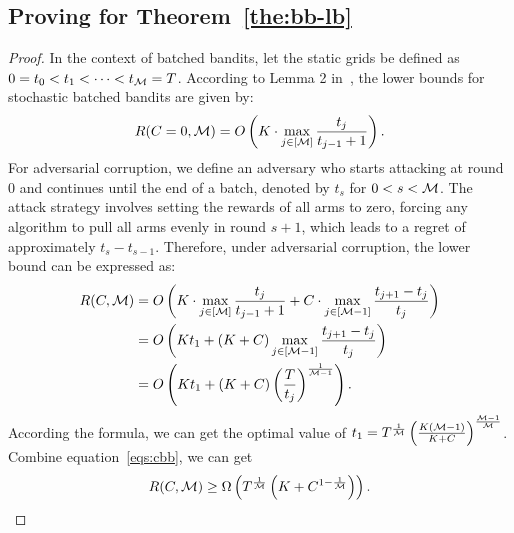 \subsection{Proving for Theorem~\ref{the:bb-lb}}
\begin{proof}
    In the context of batched bandits, let the static grids be defined as \( 0 = t_0 < t_1 < \cdots < t_{{\mathcal{M}}} = T \). According to Lemma 2 in~\cite{gao2019batched}, the lower bounds for stochastic batched bandits are given by:
    \begin{equation}
    \label{eqs:sbb}
        R(C = 0, {\mathcal{M}}) = O\left(K \cdot \max_{j \in [{\mathcal{M}}]}\frac{t_j}{t_{j-1} + 1}\right).
    \end{equation}
    For adversarial corruption, we define an adversary who starts attacking at round \(0\) and continues until the end of a batch, denoted by \( t_s \) for \( 0 < s < {\mathcal{M}} \). The attack strategy involves setting the rewards of all arms to zero, forcing any algorithm to pull all arms evenly in round \( s+1 \), which leads to a regret of approximately \( t_s - t_{s-1} \). Therefore, under adversarial corruption, the lower bound can be expressed as:
    \begin{equation}
    \label{eqs:cbb}
        \begin{split}
        R(C, {\mathcal{M}}) 
        &= O\left(K \cdot \max_{j \in [{\mathcal{M}}]}\frac{t_j}{t_{j-1} + 1} + C \cdot \max_{j \in [{\mathcal{M}}-1]}\frac{t_{j+1} - t_{j}}{t_{j}}\right) \\
        &= O\left(Kt_1 + (K+C)\max_{j \in [{\mathcal{M}}-1]}\frac{t_{j+1} - t_{j}}{t_{j}}\right) \\
        &= O\left(Kt_1 + (K+C)\left(\frac{T}{t_j}\right)^{\frac{1}{{\mathcal{M}} - 1}}\right).
        \end{split}
    \end{equation}
    According the formula, we can get the optimal value of $t_1 = T^{\frac{1}{{\mathcal{M}}}} \left(\frac{K({\mathcal{M}} - 1)}{K + C}\right)^{\frac{{\mathcal{M}} - 1}{{\mathcal{M}}}}$. Combine equation~\ref{eqs:cbb}, we can get
    \[R(C,{\mathcal{M}}) \geq \Omega \left(T^{\frac{1}{{\mathcal{M}}}}\left(K + C^{1 - \frac{1}{{\mathcal{M}}}}\right)\right).\]
\end{proof}
